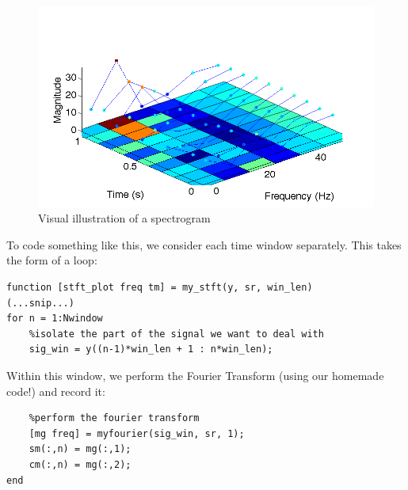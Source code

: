 \documentclass{article}
\begin{document}

\begin{figure}[htbp]
\begin{center}
\includegraphics[scale=0.50]{sglink2}
\caption{Visual illustration of a spectrogram}
\label{fig:sgex}
\end{center}
\end{figure}




To code something like this, we consider each time window separately.  This takes the form of a loop:

\begin{verbatim}
function [stft_plot freq tm] = my_stft(y, sr, win_len)
(...snip...)
for n = 1:Nwindow 
    %isolate the part of the signal we want to deal with
    sig_win = y((n-1)*win_len + 1 : n*win_len);
\end{verbatim}

Within this window, we perform the Fourier Transform (using our homemade code!) and record it:

\begin{verbatim}
    %perform the fourier transform
    [mg freq] = myfourier(sig_win, sr, 1);
    sm(:,n) = mg(:,1);
    cm(:,n) = mg(:,2);
end
\end{verbatim}
\end{document}

